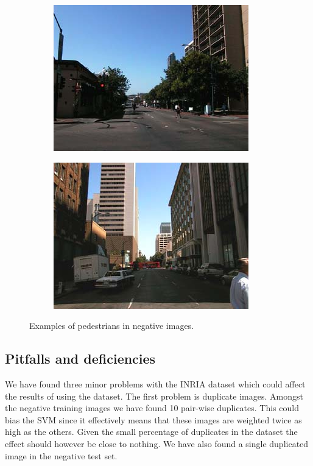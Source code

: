 \documentclass[thesis.tex]{subfiles}
\begin{document}
\begin{figure}[p]
{\begin{subfigure}[t]{0.593\textwidth}
		\includegraphics[width=\textwidth]{img/inriaManExample1.png}
	\end{subfigure}
	\begin{subfigure}[t]{0.593\textwidth}
		\includegraphics[width=\textwidth]{img/inriaManOccluded.png}
	\end{subfigure}
	}
	\caption{Examples of pedestrians in negative images.}
	\label{fig:inriaNegativePersons}
\end{figure}

\subsection{Pitfalls and deficiencies}
\label{sec:INRIApitfalls}
We have found three minor problems with the INRIA dataset which could affect the results of using the dataset. The first problem is duplicate images. Amongst the negative training images we have found 10 pair-wise duplicates. This could bias the SVM since it effectively means that these images are weighted twice as high as the others. Given the small percentage of duplicates in the dataset the effect should however be close to nothing. We have also found a single duplicated image in the negative test set.
\end{document}
